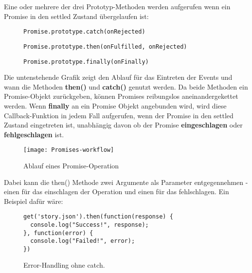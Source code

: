 \noindent
Eine oder mehrere der drei Prototyp-Methoden werden aufgerufen wenn ein Promise in den settled Zustand übergelaufen ist:

\begin{description}

\begin{figure}[H]
\item \begin{lstlisting}
Promise.prototype.catch(onRejected)
\end{lstlisting}
\end{figure}

\begin{figure}[H]
\item \begin{lstlisting}
Promise.prototype.then(onFulfilled, onRejected)
\end{lstlisting}
\end{figure}
 
\begin{figure}[H]
\item \begin{lstlisting} 
Promise.prototype.finally(onFinally)
\end{lstlisting}
\end{figure}
 
\end{description}

\noindent
Die untenstehende Grafik zeigt den Ablauf für das Eintreten der Events und wann die Methoden \textbf{then()} und \textbf{catch()} genutzt werden. Da beide Methoden ein Promise-Objekt zurückgeben, können Promises reibungslos aneinandergekettet werden. Wenn \textbf{finally} an ein Promise Objekt angebunden wird, wird diese Callback-Funktion in jedem Fall aufgerufen, wenn der Promise in den settled Zustand eingetreten ist, unabhängig davon ob der Promise \textbf{eingeschlagen} oder \textbf{fehlgeschlagen} ist.


\begin{figure}[H]
\texttt{[image: Promises-workflow]}
\caption{Ablauf eines Promise-Operation \cite{promise-executor}}
\end{figure}

\noindent
Dabei kann die then() Methode zwei Argumente als Parameter entgegennehmen - einen für das einschlagen der Operation und einen für das fehlschlagen. Ein Beispiel dafür wäre:

\begin{figure}[H]
\begin{lstlisting}
get('story.json').then(function(response) {
  console.log("Success!", response);
}, function(error) {
  console.log("Failed!", error);
})
\end{lstlisting}
\caption{Error-Handling ohne catch. \cite{callback-vs-promises}}
\end{figure}

